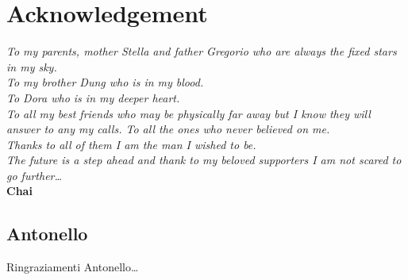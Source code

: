 \chapter{Acknowledgement}
\setlength{\parskip}{0.8em}
\begin{flushright}
	\textit{
		To my parents, mother Stella and father Gregorio who are always the fixed stars in my sky.\\
		To my brother Dung who is in my blood.\\
		To Dora who is in my deeper heart.\\
		To all my best friends who may be physically far away but I know they will answer to any my calls.
		To all the ones who never believed on me.\\
		Thanks to all of them I am the man I wished to be.\\
		The future is a step ahead and thank to my beloved supporters I am not scared to go further\dots} \\
	\textbf{Chai}
\end{flushright}
\section*{Antonello}
Ringraziamenti Antonello\dots

\setlength{\parskip}{0em}